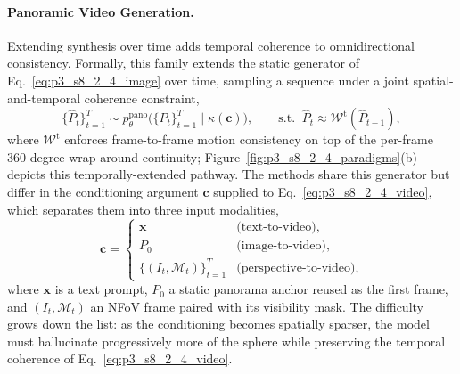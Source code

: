 \paragraph{Panoramic Video Generation.}
Extending synthesis over time adds temporal coherence to omnidirectional consistency.
Formally, this family extends the static generator of Eq.~\eqref{eq:p3_s8_2_4_image} over time, sampling a sequence under a joint spatial-and-temporal coherence constraint,
\begin{equation}
\{\hat{P}_t\}_{t=1}^{T} \sim p_\theta^{\text{pano}}\!\big(\{P_t\}_{t=1}^{T} \mid \kappa(\mathbf{c})\big),
\qquad
\text{s.t.}\;\; \hat{P}_t \approx \mathcal{W}^{\text{t}}(\hat{P}_{t-1}),
\label{eq:p3_s8_2_4_video}
\end{equation}
where $\mathcal{W}^{\text{t}}$ enforces frame-to-frame motion consistency on top of the per-frame 360-degree wrap-around continuity; Figure~\ref{fig:p3_s8_2_4_paradigms}(b) depicts this temporally-extended pathway.
The methods share this generator but differ in the conditioning argument $\mathbf{c}$ supplied to Eq.~\eqref{eq:p3_s8_2_4_video}, which separates them into three input modalities,
\begin{equation}
\mathbf{c}=
\begin{cases}
\mathbf{x} & \text{(text-to-video)},\\
P_0 & \text{(image-to-video)},\\
\{(I_t,\mathcal{M}_t)\}_{t=1}^{T} & \text{(perspective-to-video)},
\end{cases}
\label{eq:p3_s8_2_4_video_cond}
\end{equation}
where $\mathbf{x}$ is a text prompt, $P_0$ a static panorama anchor reused as the first frame, and $(I_t,\mathcal{M}_t)$ an NFoV frame paired with its visibility mask. The difficulty grows down the list: as the conditioning becomes spatially sparser, the model must hallucinate progressively more of the sphere while preserving the temporal coherence of Eq.~\eqref{eq:p3_s8_2_4_video}.

